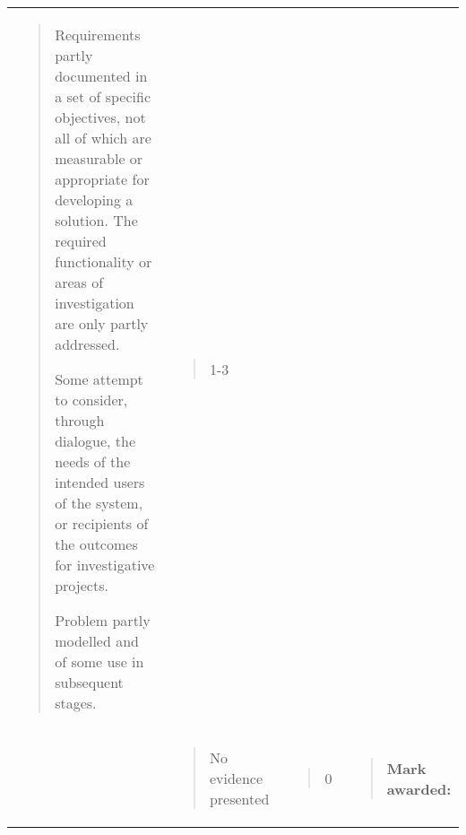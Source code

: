 \documentclass[
]{article}
\begin{document}
\begin{longtable}[]{@{}llll@{}}
\begin{minipage}[t]{0.22\columnwidth}
\begin{quote}
Requirements partly documented in a set of specific objectives, not all
of which are measurable or appropriate for developing a solution. The
required functionality or areas of investigation are only partly
addressed.

Some attempt to consider, through dialogue, the needs of the intended
users of the system, or recipients of the outcomes for investigative
projects.

Problem partly modelled and of some use in subsequent stages.
\end{quote}\strut
\end{minipage} & \begin{minipage}[t]{0.22\columnwidth}\raggedright
\begin{quote}
1-3
\end{quote}\strut
\end{minipage} & \begin{minipage}[t]{0.22\columnwidth}\raggedright
\strut
\end{minipage}\tabularnewline
\begin{minipage}[t]{0.22\columnwidth}\raggedright
\strut
\end{minipage} & \begin{minipage}[t]{0.22\columnwidth}\raggedright
\begin{quote}
No evidence presented
\end{quote}\strut
\end{minipage} & \begin{minipage}[t]{0.22\columnwidth}\raggedright
\begin{quote}
0
\end{quote}\strut
\end{minipage} & \begin{minipage}[t]{0.22\columnwidth}\raggedright
\begin{quote}
\textbf{Mark awarded:}
\end{quote}\strut
\end{minipage}\tabularnewline
\bottomrule
\end{longtable}
\end{document}
